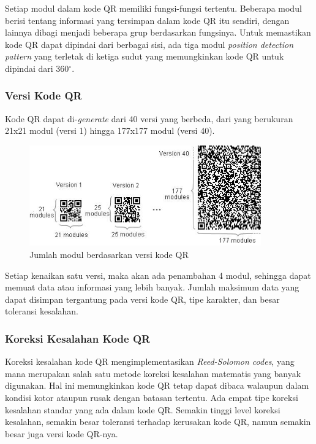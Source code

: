 Setiap modul dalam kode QR memiliki fungsi-fungsi tertentu. Beberapa modul berisi tentang informasi yang tersimpan dalam kode QR itu sendiri, dengan lainnya
dibagi menjadi beberapa grup berdasarkan fungsinya. Untuk memastikan kode QR dapat dipindai dari berbagai sisi, ada tiga modul \emph{position detection
	pattern} yang terletak di ketiga sudut yang memungkinkan kode QR untuk dipindai dari 360$^{\circ}$.

\subsubsection{Versi Kode QR}
Kode QR dapat di-\emph{generate} dari 40 versi yang berbeda, dari yang berukuran 21x21 modul (versi 1) hingga 177x177 modul (versi 40).

\begin{figure}[h]
	\centering
	\includegraphics[width=10cm]{contents/chapter-2/2-versiqr.jpg}
	\caption{Jumlah modul berdasarkan versi kode QR}
	\label{Fig: 2-versiqr}
\end{figure}

Setiap kenaikan satu versi, maka akan ada penambahan 4 modul, sehingga dapat memuat data atau informasi yang lebih banyak. Jumlah maksimum data yang dapat
disimpan tergantung pada versi kode QR, tipe karakter, dan besar toleransi kesalahan.

\subsubsection{Koreksi Kesalahan Kode QR}
Koreksi kesalahan kode QR mengimplementasikan \emph{Reed-Solomon codes}, yang mana merupakan salah satu metode koreksi kesalahan matematis yang banyak
digunakan. Hal ini memungkinkan kode QR tetap dapat dibaca walaupun dalam kondisi kotor ataupun rusak dengan batasan tertentu. Ada empat tipe koreksi kesalahan
standar yang ada dalam kode QR. Semakin tinggi level koreksi kesalahan, semakin besar toleransi terhadap kerusakan kode QR, namun semakin besar juga versi kode
QR-nya.

